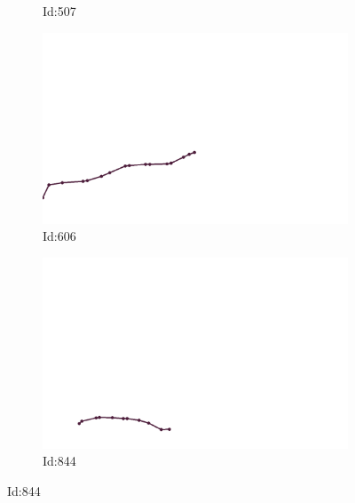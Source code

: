 \documentclass[12pt,twoside]{report}
\begin{document}
\begin{figure}
\begin{subfigure}[b]{0.20\textwidth}
\caption{Id:507}
\end{subfigure}
\begin{subfigure}[b]{0.20\textwidth}
\centering
\includegraphics[width=\textwidth]{../../trajectories/606.png}
\caption{Id:606}
\end{subfigure}
\begin{subfigure}[b]{0.20\textwidth}
\centering
\includegraphics[width=\textwidth]{../../trajectories/844.png}
\caption{Id:844}
\end{subfigure}
\end{figure}
\end{document}
